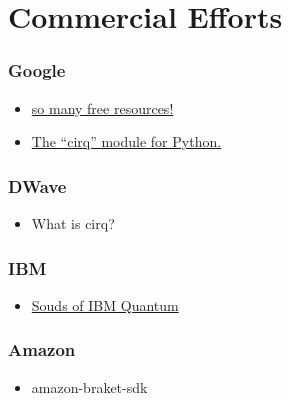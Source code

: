 \documentclass[aspectratio=169]{beamer} %
\begin{document}
\section{Commercial Efforts}
\begin{frame}{}
    \frametitle{Google}
     \begin{itemize}
         \item \href{https://quantumai.google/cirq/tutorials}{so many free resources!}
         \item \href{https://www.youtube.com/watch?v=16ZfkPRVf2w}{The ``cirq'' module for Python.}
     \end{itemize}
\end{frame}

\begin{frame}{}
    \frametitle{DWave}
    \begin{itemize}
        \item What is cirq?
    \end{itemize}
\end{frame}

\begin{frame}{}
    \frametitle{IBM}
    \begin{itemize}
        \item \href{https://www.youtube.com/watch?v=o-FyH2A7Ed0}{Souds of IBM Quantum}
    \end{itemize}
\end{frame}

\begin{frame}{}
    \frametitle{Amazon}
    \begin{itemize}
        \item amazon-braket-sdk
    \end{itemize}
\end{frame}
\end{document}
